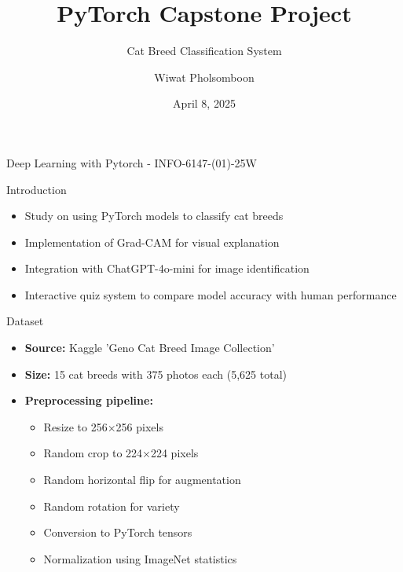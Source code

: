 \documentclass{beamer}
\title{\textcolor{maincolor}{\LARGE PyTorch Capstone Project}}
\subtitle{\textcolor{secondcolor}{Cat Breed Classification System}}
\author{\textcolor{secondcolor}{Wiwat Pholsomboon}}
\date{\textcolor{secondcolor}{April 8, 2025}}
\begin{document}
\begin{frame}
    \titlepage
    \begin{center}
        \textcolor{secondcolor}{Deep Learning with Pytorch - INFO-6147-(01)-25W}
    \end{center}
\end{frame}

\begin{frame}{Introduction}
    \begin{itemize}
        \item Study on using PyTorch models to classify cat breeds
        \item Implementation of Grad-CAM for visual explanation
        \item Integration with ChatGPT-4o-mini for image identification
        \item Interactive quiz system to compare model accuracy with human performance
    \end{itemize}
\end{frame}

\begin{frame}{Dataset}
    \begin{itemize}
        \item \textbf{Source:} Kaggle 'Geno Cat Breed Image Collection'
        \item \textbf{Size:} 15 cat breeds with 375 photos each (5,625 total)
        \item \textbf{Preprocessing pipeline:}
        \begin{itemize}
            \item Resize to 256×256 pixels
            \item Random crop to 224×224 pixels
            \item Random horizontal flip for augmentation
            \item Random rotation for variety
            \item Conversion to PyTorch tensors
            \item Normalization using ImageNet statistics
        \end{itemize}
    \end{itemize}
\end{frame}
\end{document}
